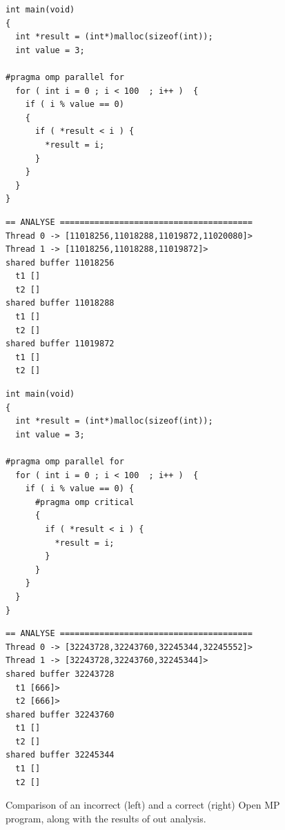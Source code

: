\begin{figure}
  \centering
  \lstset{language=C, basicstyle=\small}

  \begin{minipage}{.45\textwidth}
    \begin{lstlisting}
int main(void) 
{
  int *result = (int*)malloc(sizeof(int));
  int value = 3;
  
#pragma omp parallel for 
  for ( int i = 0 ; i < 100  ; i++ )  {
    if ( i % value == 0) 
    {
      if ( *result < i ) {
        *result = i;
      }
    }
  }
}
    \end{lstlisting}
    \vspace{8mm}
    \lstset{basicstyle=\scriptsize}
    \begin{lstlisting}
== ANALYSE =======================================
Thread 0 -> [11018256,11018288,11019872,11020080]>
Thread 1 -> [11018256,11018288,11019872]>
shared buffer 11018256
  t1 []
  t2 []
shared buffer 11018288
  t1 []
  t2 []
shared buffer 11019872
  t1 []
  t2 []
    \end{lstlisting}
  \end{minipage}
  \hspace{.025\textwidth}
  \hspace{.025\textwidth}
  \begin{minipage}{.45\textwidth}
    \begin{lstlisting}
int main(void) 
{
  int *result = (int*)malloc(sizeof(int));
  int value = 3;
  
#pragma omp parallel for 
  for ( int i = 0 ; i < 100  ; i++ )  {
    if ( i % value == 0) {
      #pragma omp critical 
      {
        if ( *result < i ) {
          *result = i;
        }
      }
    }
  }
}
    \end{lstlisting}
    \lstset{basicstyle=\scriptsize}
    \begin{lstlisting}
== ANALYSE =======================================
Thread 0 -> [32243728,32243760,32245344,32245552]>
Thread 1 -> [32243728,32243760,32245344]>
shared buffer 32243728
  t1 [666]>
  t2 [666]>
shared buffer 32243760
  t1 []
  t2 []
shared buffer 32245344
  t1 []
  t2 []
    \end{lstlisting}
  \end{minipage}
  \caption{Comparison of an incorrect (left) and a correct (right)
    Open MP program, along with the results of out analysis.}
  \label{fig:openmp}
\end{figure}



